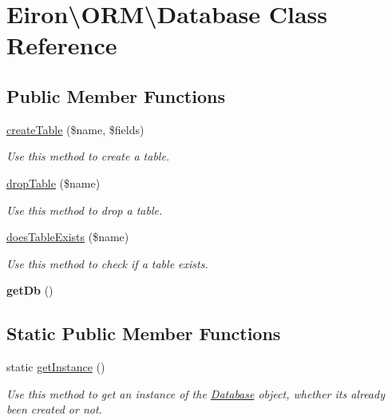 \hypertarget{class_eiron_1_1_o_r_m_1_1_database}{}\section{Eiron\textbackslash{}O\+RM\textbackslash{}Database Class Reference}
\label{class_eiron_1_1_o_r_m_1_1_database}
\subsection*{Public Member Functions}
\begin{DoxyCompactItemize}
\item 
\hyperlink{class_eiron_1_1_o_r_m_1_1_database_a7ff74061716d7e430b285ed7fe3b1b4b}{create\+Table} (\$name, \$fields)
\begin{DoxyCompactList}\small\item\em Use this method to create a table. \end{DoxyCompactList}\item 
\hyperlink{class_eiron_1_1_o_r_m_1_1_database_a077fdc693900acd6219508fcf280b2ec}{drop\+Table} (\$name)
\begin{DoxyCompactList}\small\item\em Use this method to drop a table. \end{DoxyCompactList}\item 
\hyperlink{class_eiron_1_1_o_r_m_1_1_database_a5bfeb781f51df32bf1b98935a1f7e72f}{does\+Table\+Exists} (\$name)
\begin{DoxyCompactList}\small\item\em Use this method to check if a table exists. \end{DoxyCompactList}\item 
{\bfseries get\+Db} ()\hypertarget{class_eiron_1_1_o_r_m_1_1_database_a8f42d2166081f9fcb6f31bbe462b041e}{}\label{class_eiron_1_1_o_r_m_1_1_database_a8f42d2166081f9fcb6f31bbe462b041e}

\end{DoxyCompactItemize}
\subsection*{Static Public Member Functions}
\begin{DoxyCompactItemize}
\item 
static \hyperlink{class_eiron_1_1_o_r_m_1_1_database_a2c71f593259023f4e6071ea28d144b24}{get\+Instance} ()
\begin{DoxyCompactList}\small\item\em Use this method to get an instance of the \hyperlink{class_eiron_1_1_o_r_m_1_1_database}{Database} object, whether it\textquotesingle{}s already been created or not. \end{DoxyCompactList}\end{DoxyCompactItemize}


